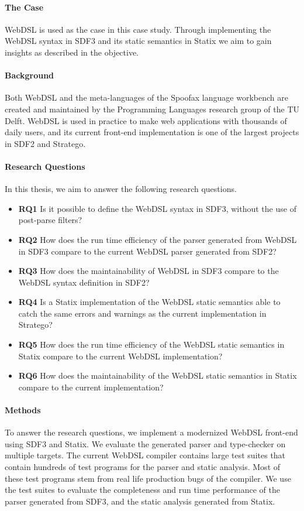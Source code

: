     \paragraph{The Case} WebDSL is used as the case in this case study. Through implementing the WebDSL syntax in SDF3 and its static semantics in Statix we aim to gain insights as described in the objective.

    \paragraph{Background} Both WebDSL and the meta-languages of the Spoofax language workbench are created and maintained by the Programming Languages research group of the TU Delft. WebDSL is used in practice to make web applications with thousands of daily users, and its current front-end implementation is one of the largest projects in SDF2 and Stratego.

    \paragraph{Research Questions} In this thesis, we aim to answer the following research questions.

    \begin{itemize}
      \item \textbf{RQ1} Is it possible to define the WebDSL syntax in SDF3, without the use of post-parse filters?
      \item \textbf{RQ2} How does the run time efficiency of the parser generated from WebDSL in SDF3 compare to the current WebDSL parser generated from SDF2?
      \item \textbf{RQ3} How does the maintainability of WebDSL in SDF3 compare to the WebDSL syntax definition in SDF2?
      \item \textbf{RQ4} Is a Statix implementation of the WebDSL static semantics able to catch the same errors and warnings as the current implementation in Stratego?
      \item \textbf{RQ5} How does the run time efficiency of the WebDSL static semantics in Statix compare to the current WebDSL implementation?
      \item \textbf{RQ6} How does the maintainability of the WebDSL static semantics in Statix compare to the current implementation?
    \end{itemize}

    \paragraph{Methods} To answer the research questions, we implement a modernized WebDSL front-end using SDF3 and Statix. We evaluate the generated parser and type-checker on multiple targets. The current WebDSL compiler contains large test suites that contain hundreds of test programs for the parser and static analysis. Most of these test programs stem from real life production bugs of the compiler. We use the test suites to evaluate the completeness and run time performance of the parser generated from SDF3, and the static analysis generated from Statix.

